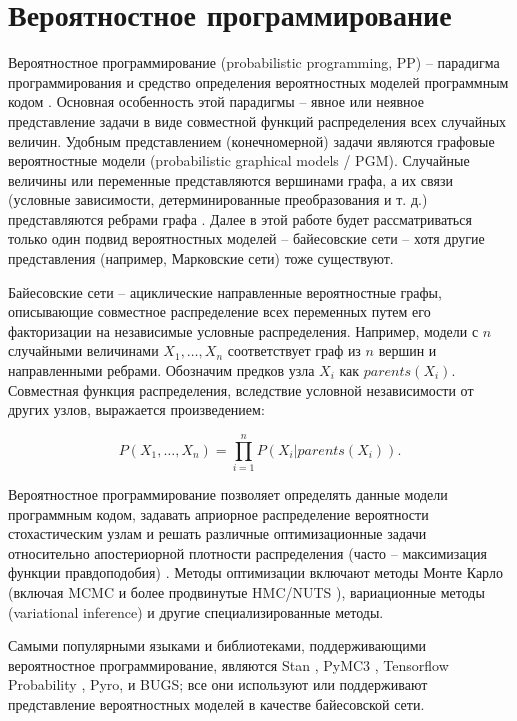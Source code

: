 \documentclass[a4paper,14pt]{extreport}
\begin{document}
\section{Вероятностное программирование}

\label{section:prob_prog}

Вероятностное программирование (probabilistic programming, PP) -- парадигма программирования и средство определения вероятностных моделей программным кодом \cite{intro_to_pp}. Основная особенность этой парадигмы – явное или неявное представление задачи в виде совместной функций распределения всех случайных величин. Удобным представлением (конечномерной) задачи являются графовые вероятностные модели 
(probabilistic graphical models / PGM). 
Случайные величины или переменные представляются вершинами графа, а их связи (условные зависимости, детерминированные преобразования и т. д.) представляются ребрами графа \cite{intro_to_pp}. Далее в этой работе будет рассматриваться только один подвид вероятностных моделей -- байесовские сети -- хотя другие представления (например, Марковские сети) тоже существуют.

Байесовские сети -- ациклические направленные вероятностные графы, описывающие совместное распределение всех переменных путем его факторизации на независимые условные распределения. Например, модели с $n$ случайными величинами $X_1, \dots, X_n$ соответствует граф из $n$ вершин и направленными ребрами. Обозначим предков узла $X_i$ как $\mathit{parents}(X_i)$. Совместная функция распределения, вследствие условной независимости от других узлов, выражается произведением:

\begin{equation}
	P(X_1, \dots, X_n) = \prod_{i=1}^{n}{P(X_i | \mathit{parents}(X_i))} .
\end{equation}

Вероятностное программирование позволяет определять данные модели программным кодом, задавать априорное распределение вероятности стохастическим узлам и решать различные оптимизационные задачи относительно апостериорной плотности распределения (часто -- максимизация функции правдоподобия) \cite{stan_overview,pymc3_2016}. Методы оптимизации включают методы Монте Карло (включая MCMC и более продвинутые HMC/NUTS \cite{nuts_hoffman_gelman}), вариационные методы (variational inference) и другие специализированные методы.

Самыми популярными языками и библиотеками, поддерживающими вероятностное программирование, являются
Stan \cite{stan_overview}, PyMC3 \cite{pymc3_2016}, Tensorflow Probability \cite{tfp_distributions}, Pyro,
и BUGS; 
все они используют или поддерживают представление вероятностных моделей в качестве байесовской сети.
\end{document}
